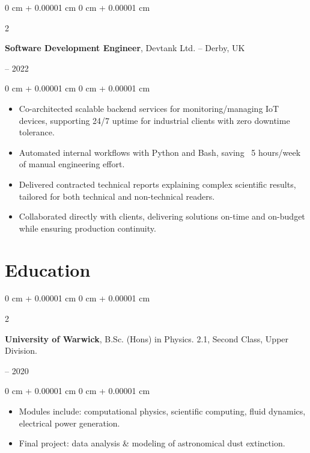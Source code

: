 \documentclass[10pt, letterpaper]{article}
\newenvironment{highlights}{
    \begin{itemize}[
        topsep=0.15 cm,
        parsep=0.15 cm,
        partopsep=0pt,
        itemsep=0pt,
        leftmargin=0 cm + 10pt
    ]
}{
    \end{itemize}
}
\newenvironment{onecolentry}{
    \begin{adjustwidth}{
        0 cm + 0.00001 cm
    }{
        0 cm + 0.00001 cm
    }
}{
    \end{adjustwidth}
}
\newenvironment{twocolentry}[2][]{
    \onecolentry
    \def\secondColumn{#2}
    \setcolumnwidth{\fill, 4.5 cm}
    \begin{paracol}{2}
}{
    \switchcolumn \raggedleft \secondColumn
    \end{paracol}
    \endonecolentry
}
\begin{document}
        \vspace{0.2 cm}

        \begin{twocolentry}{
            2020 – 2022
        }
            \textbf{Software Development Engineer}, Devtank Ltd. -- Derby, UK
        \end{twocolentry}

        \vspace{0.10 cm}
        \begin{onecolentry}
            \begin{highlights}
                \item Co-architected scalable backend services for monitoring/managing IoT devices, supporting 24/7 uptime for industrial clients with zero downtime tolerance.
                \item Automated internal workflows with Python and Bash, saving ~5 hours/week of manual engineering effort.
                \item Delivered contracted technical reports explaining complex scientific results, tailored for both technical and non-technical readers.
                \item Collaborated directly with clients, delivering solutions on-time and on-budget while ensuring production continuity.
            \end{highlights}
        \end{onecolentry}

    \section{Education}
        \begin{twocolentry}{
            2017 – 2020
        }
            \textbf{University of Warwick}, B.Sc. (Hons) in Physics. 2.1, Second Class, Upper Division.
        \end{twocolentry}

        \vspace{0.10 cm}
        \begin{onecolentry}
            \begin{highlights}
                \item Modules include: computational physics, scientific computing, fluid dynamics, electrical power generation.
                \item Final project: data analysis \& modeling of astronomical dust extinction.
            \end{highlights}
        \end{onecolentry}
\end{document}
